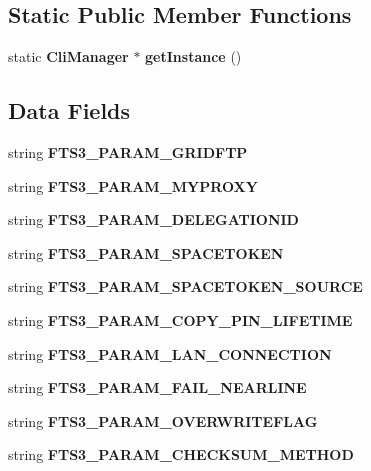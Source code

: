 \subsection*{Static Public Member Functions}
\begin{DoxyCompactItemize}
\item 
static {\bf CliManager} $\ast$ {\bfseries getInstance} ()\label{classCliManager_af57b7314f1b46545d3d07055a9a96578}

\end{DoxyCompactItemize}
\subsection*{Data Fields}
\begin{DoxyCompactItemize}
\item 
string {\bfseries FTS3\_\-PARAM\_\-GRIDFTP}\label{classCliManager_a6b85959ca6e7f83a2dc1080810f54742}

\item 
string {\bfseries FTS3\_\-PARAM\_\-MYPROXY}\label{classCliManager_a5138b724bb7cdad2ece461f461418d42}

\item 
string {\bfseries FTS3\_\-PARAM\_\-DELEGATIONID}\label{classCliManager_ab7bdb8836e0d3789f6acb1fd4f4d7eca}

\item 
string {\bfseries FTS3\_\-PARAM\_\-SPACETOKEN}\label{classCliManager_a0bb93b6fc6e7dbfa1219934d8ba37265}

\item 
string {\bfseries FTS3\_\-PARAM\_\-SPACETOKEN\_\-SOURCE}\label{classCliManager_a0a14ec3c952e0891b8a3351933b4d47e}

\item 
string {\bfseries FTS3\_\-PARAM\_\-COPY\_\-PIN\_\-LIFETIME}\label{classCliManager_a510a7710137bfa97a113b4684f266424}

\item 
string {\bfseries FTS3\_\-PARAM\_\-LAN\_\-CONNECTION}\label{classCliManager_a3e92365401259a3cc13268baee5eaffa}

\item 
string {\bfseries FTS3\_\-PARAM\_\-FAIL\_\-NEARLINE}\label{classCliManager_a5942426466438df29420acbfd6c48709}

\item 
string {\bfseries FTS3\_\-PARAM\_\-OVERWRITEFLAG}\label{classCliManager_a5648f2bf1d8746b8632d2b3072ba8c08}

\item 
string {\bfseries FTS3\_\-PARAM\_\-CHECKSUM\_\-METHOD}\label{classCliManager_a2708547972dcbcc46622b923543ba3f7}


\end{DoxyCompactItemize}
